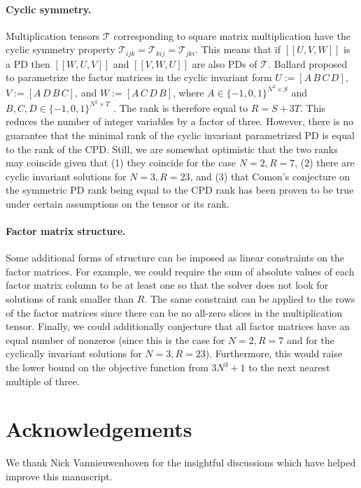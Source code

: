 \documentclass{article}
\begin{document}
\paragraph{Cyclic symmetry.} Multiplication tensors $\mathcal{T}$ corresponding to square matrix multiplication have the cyclic symmetry property $\mathcal{T}_{ijk} = \mathcal{T}_{kij} = \mathcal{T}_{jki}$. This means that if $[\![U,V,W]\!]$ is a PD then $[\![W,U,V]\!]$ and $[\![V,W,U]\!]$ are also PDs of $\mathcal{T}$. Ballard proposed to parametrize the factor matrices in the cyclic invariant form $U := [A\,B\,C\,D]$, $V := [A\,D\,B\,C]$, and $W := [A\,C\,D\,B]$, where $A \in \{-1,0,1\}^{N^2 \times S}$ and $B,C,D \in \{-1,0,1\}^{N^2 \times T}$ \cite{Ballard2017}. The rank is therefore equal to $R = S + 3T$. This reduces the number of integer variables by a factor of three. However, there is no guarantee that the minimal rank of the cyclic invariant parametrized PD is equal to the rank of the CPD. Still, we are somewhat optimistic that the two ranks may coincide given that (1) they coincide for the case $N=2,R=7$, (2) there are cyclic invariant solutions for $N=3,R=23$, and (3) that Comon's conjecture on the symmetric PD rank being equal to the CPD rank has been proven to be true under certain assumptions on the tensor or its rank.

\paragraph{Factor matrix structure.} Some additional forms of structure can be imposed as linear constraints on the factor matrices. For example, we could require the sum of absolute values of each factor matrix column to be at least one so that the solver does not look for solutions of rank smaller than $R$. The same constraint can be applied to the rows of the factor matrices since there can be no all-zero slices in the multiplication tensor. Finally, we could additionally conjecture that all factor matrices have an equal number of nonzeros (since this is the case for $N=2,R=7$ and for the cyclically invariant solutions for $N=3,R=23$). Furthermore, this would raise the lower bound on the objective function from $3N^3 + 1$ to the next nearest multiple of three.

\section*{Acknowledgements}

We thank Nick Vannieuwenhoven for the insightful discussions which have helped improve this manuscript.



\end{document}
